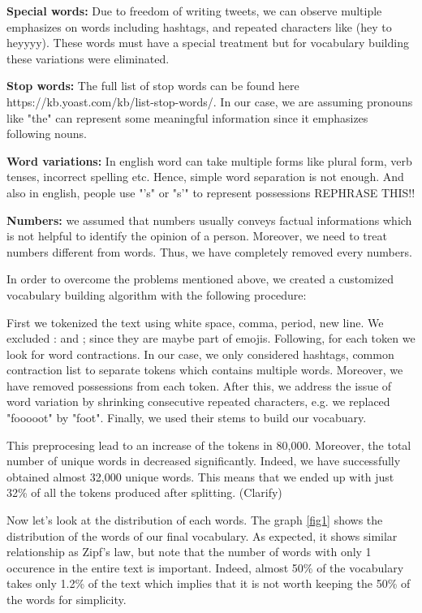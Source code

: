 \documentclass[10pt,conference,compsocconf]{IEEEtran}
\begin{document}
\textbf{Special words:} Due to freedom of writing tweets, we can observe multiple emphasizes on words including hashtags, and repeated characters like (hey to heyyyy). These words must have a special treatment but for vocabulary building these variations were eliminated.

\textbf{Stop words:} The full list of stop words can be found here https://kb.yoast.com/kb/list-stop-words/. In our case, we are assuming pronouns like "the" can represent some meaningful information since it emphasizes following nouns.

\textbf{Word variations:} In english word can take multiple forms like plural form, verb tenses, incorrect spelling etc. Hence, simple word separation is not enough. And also in english, people use "'s" or "s'" to represent possessions REPHRASE THIS!! 

\textbf{Numbers:} we assumed that numbers usually conveys factual informations which is not helpful to identify the opinion of a person. Moreover, we need to treat numbers different from words. Thus, we have completely removed every numbers.

In order to overcome the problems mentioned above, we created a customized vocabulary building algorithm with the following procedure:

First we tokenized the text using white space, comma, period, new line. We excluded : and ; since they are maybe part of emojis.
Following, for each token we look for word contractions. In our case, we only considered hashtags, common contraction list to separate tokens which contains multiple words. Moreover, we have removed possessions from each token.
After this, we address the issue of word variation by shrinking consecutive repeated characters, e.g. we replaced "fooooot" by "foot". Finally, we used their stems to build our vocabuary.

This preprocesing lead to an increase of the tokens in 80,000. Moreover, the total number of unique words in decreased significantly. Indeed, we have successfully obtained almost 32,000 unique words. This means that we ended up with just 32\% of all the tokens produced after splitting. (Clarify)

Now let's look at the distribution of each words. The graph \ref{fig1} shows the distribution of the words of our final vocabulary. As expected, it shows similar relationship as Zipf's law, but note that the number of words with only 1 occurence in the entire text is important. Indeed, almost 50\% of the vocabulary takes only 1.2\% of the text which implies that it is not worth keeping the 50\% of the words for simplicity.
\end{document}
